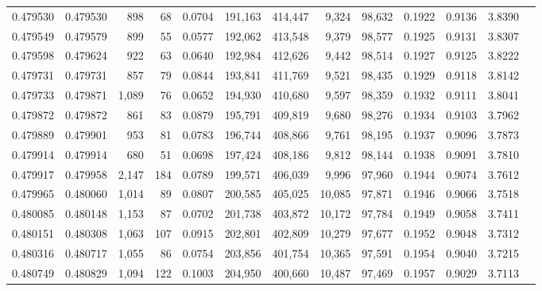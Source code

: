 \begin{tabular}{rrrrrrrrrrrrr}
0.479530 & 0.479530 &   898 &    68 &                                     0.0704 & 191,163 & 414,447 &   9,324 &  98,632 & 0.1922 & 0.9136 & 3.8390 \\
0.479549 & 0.479579 &   899 &    55 &                                     0.0577 & 192,062 & 413,548 &   9,379 &  98,577 & 0.1925 & 0.9131 & 3.8307 \\
0.479598 & 0.479624 &   922 &    63 &                                     0.0640 & 192,984 & 412,626 &   9,442 &  98,514 & 0.1927 & 0.9125 & 3.8222 \\
0.479731 & 0.479731 &   857 &    79 &                                     0.0844 & 193,841 & 411,769 &   9,521 &  98,435 & 0.1929 & 0.9118 & 3.8142 \\
0.479733 & 0.479871 & 1,089 &    76 &                                     0.0652 & 194,930 & 410,680 &   9,597 &  98,359 & 0.1932 & 0.9111 & 3.8041 \\
0.479872 & 0.479872 &   861 &    83 &                                     0.0879 & 195,791 & 409,819 &   9,680 &  98,276 & 0.1934 & 0.9103 & 3.7962 \\
0.479889 & 0.479901 &   953 &    81 &                                     0.0783 & 196,744 & 408,866 &   9,761 &  98,195 & 0.1937 & 0.9096 & 3.7873 \\
0.479914 & 0.479914 &   680 &    51 &                                     0.0698 & 197,424 & 408,186 &   9,812 &  98,144 & 0.1938 & 0.9091 & 3.7810 \\
0.479917 & 0.479958 & 2,147 &   184 &                                     0.0789 & 199,571 & 406,039 &   9,996 &  97,960 & 0.1944 & 0.9074 & 3.7612 \\
0.479965 & 0.480060 & 1,014 &    89 &                                     0.0807 & 200,585 & 405,025 &  10,085 &  97,871 & 0.1946 & 0.9066 & 3.7518 \\
0.480085 & 0.480148 & 1,153 &    87 &                                     0.0702 & 201,738 & 403,872 &  10,172 &  97,784 & 0.1949 & 0.9058 & 3.7411 \\
0.480151 & 0.480308 & 1,063 &   107 &                                     0.0915 & 202,801 & 402,809 &  10,279 &  97,677 & 0.1952 & 0.9048 & 3.7312 \\
0.480316 & 0.480717 & 1,055 &    86 &                                     0.0754 & 203,856 & 401,754 &  10,365 &  97,591 & 0.1954 & 0.9040 & 3.7215 \\
0.480749 & 0.480829 & 1,094 &   122 &                                     0.1003 & 204,950 & 400,660 &  10,487 &  97,469 & 0.1957 & 0.9029 & 3.7113 \\

\end{tabular}
